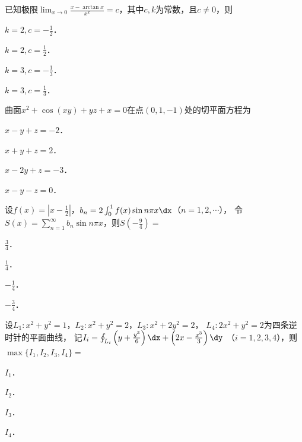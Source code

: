 \documentclass[plain,noanswer,medmath]{../../template/jnuexam}
\begin{document}




\begin{problem}
已知极限$\lim_{x \to 0} \frac{x - \arctan x}{x^k} = c$，其中$c,k$为常数，且$c \ne 0$，则\pickout{}
\begin{abcd}
\item $k = 2,c = - \frac{1}{2}$．
\item $k = 2,c = \frac{1}{2}$．
\item $k = 3,c = - \frac{1}{3}$．
\item $k = 3,c = \frac{1}{3}$．
\end{abcd}
\end{problem}


\begin{problem}
曲面$x^2 + \cos(xy) + yz + x = 0$在点$(0,1, - 1)$处的切平面方程为\pickout{}
\begin{abcd}
\item $x - y + z = - 2$．
\item $x + y + z = 2$．
\item $x - 2y + z = - 3$．
\item $x - y - z = 0$．
\end{abcd}
\end{problem}


\begin{problem}
设$f(x) = \left| x - \frac{1}{2} \right|$，$b_n = 2\int_0^1 f(x)\sin n\pi x\dx$（$n = 1,2, \cdots$），
令$S(x) = \sum_{n = 1}^{\infty}b_n\sin n\pi x$，则$S\left(- \frac{9}{4} \right) =$\pickout{}
\begin{abcd}
\item $\frac{3}{4}$．
\item $\frac{1}{4}$．
\item $- \frac{1}{4}$．
\item $- \frac{3}{4}$．
\end{abcd}
\end{problem}


\begin{problem}
设$L_1:x^2 + y^2 = 1$，$L_2:x^2 + y^2 = 2$，$L_3:x^2 + 2y^2 = 2$，
$L_4:2x^2 + y^2 = 2$为四条逆时针的平面曲线，
记$I_i = \oint_{L_i} \left(y + \frac{y^3}{6}\right)\dx + \left(2x - \frac{x^3}{3}\right)\dy$%
（$i = 1,2,3,4$），则$\max\{I_1,I_2,I_3,I_4\} =$\pickout{}
\begin{abcd}
\item $I_1$．
\item $I_2$．
\item $I_3$．
\item $I_4$．
\end{abcd}
\end{problem}
\end{document}

